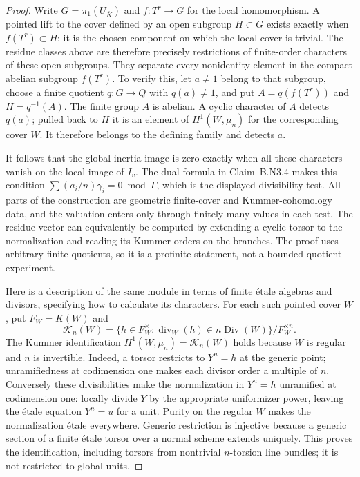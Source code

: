 \begin{proof}
Write $G=\pi_1(U_{\overline K})$ and $f:T^r\to G$ for the local
homomorphism.  A pointed lift to the cover defined by an open subgroup
$H\subset G$ exists exactly when $f(T^r)\subset H$; it is the
chosen component on which the local cover is trivial.  The residue
classes above are therefore precisely restrictions of finite-order
characters of these open subgroups.  They separate every nonidentity
element in the compact abelian subgroup $f(T^r)$.  To verify this,
let $a\ne1$ belong to that subgroup, choose a finite quotient
$q:G\to Q$ with $q(a)\ne1$, and put
$A=q(f(T^r))$ and $H=q^{-1}(A)$.  The finite group $A$ is abelian.
A cyclic character of $A$ detects $q(a)$; pulled back to $H$ it is
an element of $H^1(W,\mu_n)$ for the corresponding cover $W$.
It therefore belongs to the defining family and detects $a$.

It follows that the global inertia image is zero exactly when all
these characters vanish on the local image of $I_v$.  The dual
formula in Claim~B.N3.4 makes this condition
$\sum(a_i/n)\gamma_i=0\bmod\Gamma$, which is the displayed
divisibility test.  All parts of the construction are geometric
finite-cover and Kummer-cohomology data, and the valuation enters
only through finitely many values in each test.  The residue vector
can equivalently be computed by extending a cyclic torsor to the
normalization and reading its Kummer orders on the branches.
The proof uses arbitrary finite quotients, so it is a profinite
statement, not a bounded-quotient experiment.

Here is a description of the same module in terms of finite
\'etale algebras and divisors, specifying how to calculate its
characters.  For each such pointed cover $W$, put
$F_W=\overline K(W)$ and
\[
 \mathcal K_n(W)=
 \{h\in F_W^\times:\operatorname{div}_W(h)
       \in n\operatorname{Div}(W)\}/F_W^{\times n}.
\]
The Kummer identification $H^1(W,\mu_n)=\mathcal K_n(W)$
holds because $W$ is regular and $n$ is invertible.  Indeed, a
torsor restricts to $Y^n=h$ at the generic point;
unramifiedness at codimension one makes each divisor order a
multiple of $n$.  Conversely these divisibilities make the
normalization in $Y^n=h$ unramified at codimension one: locally
divide $Y$ by the appropriate uniformizer power, leaving the
\'etale equation $Y^n=u$ for a unit.  Purity on the regular $W$
makes the normalization \'etale everywhere.  Generic restriction
is injective because a generic section of a finite \'etale torsor
over a normal scheme extends uniquely.  This proves the
identification, including torsors from nontrivial $n$-torsion
line bundles; it is not restricted to global units.


\end{proof}
